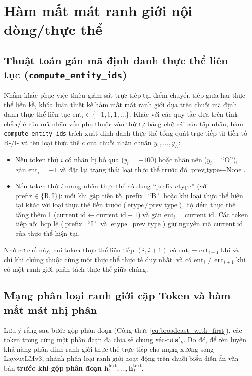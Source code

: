 \section{Hàm mất mát ranh giới nội dòng/thực thể}
\subsection{Thuật toán gán mã định danh thực thể liên tục (\texttt{compute\_entity\_ids})}
Nhằm khắc phục việc thiếu giám sát trực tiếp tại điểm chuyển tiếp giữa hai thực thể liền kề, khóa luận thiết kế hàm mất mát ranh giới dựa trên chuỗi mã định danh thực thể liên tục $\text{ent}_i \in \{-1, 0, 1, \dots\}$. Khác với các quy tắc dựa trên tính chẵn/lẻ của mã nhãn vốn phụ thuộc vào thứ tự bảng chữ cái của tập nhãn, hàm \texttt{compute\_entity\_ids} trích xuất định danh thực thể tổng quát trực tiếp từ tiền tố $\text{B-}/\text{I-}$ và tên loại thực thể $c$ của chuỗi nhãn chuẩn $y_1, \dots, y_L$:
\begin{itemize}
    \item Nếu token thứ $i$ có nhãn bị bỏ qua ($y_i = -100$) hoặc nhãn nền ($y_i = \text{``O''}$), gán $\text{ent}_i = -1$ và đặt lại trạng thái loại thực thể trước đó $\text{prev\_type} \gets \text{None}$.
    \item Nếu token thứ $i$ mang nhãn thực thể có dạng $\text{``prefix-etype''}$ (với $\text{prefix} \in \{\text{B}, \text{I}\}$): mỗi khi gặp tiền tố $\text{prefix} = \text{``B''}$ hoặc khi loại thực thể hiện tại khác với loại thực thể liền trước ($\text{etype} \neq \text{prev\_type}$), bộ đếm thực thể tăng thêm 1 ($\text{current\_id} \gets \text{current\_id} + 1$) và gán $\text{ent}_i = \text{current\_id}$. Các token tiếp nối hợp lệ ($\text{prefix} = \text{``I''}$ và $\text{etype} = \text{prev\_type}$) giữ nguyên mã $\text{current\_id}$ của thực thể hiện tại.
\end{itemize}
Nhờ cơ chế này, hai token thực thể liên tiếp $(i, i+1)$ có $\text{ent}_i = \text{ent}_{i+1}$ khi và chỉ khi chúng thuộc cùng một thực thể thực tế duy nhất, và có $\text{ent}_i \neq \text{ent}_{i+1}$ khi có một ranh giới phân tách thực thể giữa chúng.

\subsection{Mạng phân loại ranh giới cặp Token và hàm mất mát nhị phân}
Lưu ý rằng sau bước gộp phân đoạn (Công thức \ref{eq:broadcast_with_first}), các token trong cùng một phân đoạn đã chia sẻ chung véc-tơ $\mathbf{s}'_k$. Do đó, để rèn luyện khả năng phân định ranh giới thực thể trực tiếp cho mạng xương sống LayoutLMv3, nhánh phân loại ranh giới hoạt động trên chuỗi biểu diễn ẩn văn bản \textbf{trước khi gộp phân đoạn} $\mathbf{h}_1^{\text{text}}, \dots, \mathbf{h}_L^{\text{text}}$.

